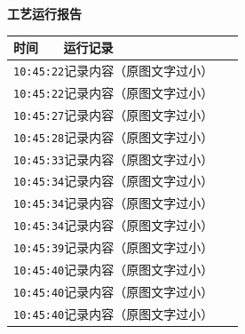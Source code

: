 \documentclass[UTF8,10pt,a4paper,fontset=fandol]{ctexart}
\newcommand{\fieldvalue}[1]{#1}
\begin{document}
\newpage

\noindent
\begin{minipage}[t]{0.48\linewidth}
\centering
\textbf{工艺运行报告}

\small
\begin{tabular}{|p{0.20\linewidth}|p{0.72\linewidth}|}
\hline
时间 & 运行记录\\ \hline
\multicolumn{2}{|l|}{
\fieldvalue{\texttt{10:45:22}\quad 记录内容（原图文字过小）}} \\ \hline
\multicolumn{2}{|l|}{
\fieldvalue{\texttt{10:45:22}\quad 记录内容（原图文字过小）}} \\ \hline
\multicolumn{2}{|l|}{
\fieldvalue{\texttt{10:45:27}\quad 记录内容（原图文字过小）}} \\ \hline
\multicolumn{2}{|l|}{
\fieldvalue{\texttt{10:45:28}\quad 记录内容（原图文字过小）}} \\ \hline
\multicolumn{2}{|l|}{
\fieldvalue{\texttt{10:45:33}\quad 记录内容（原图文字过小）}} \\ \hline
\multicolumn{2}{|l|}{
\fieldvalue{\texttt{10:45:34}\quad 记录内容（原图文字过小）}} \\ \hline
\multicolumn{2}{|l|}{
\fieldvalue{\texttt{10:45:34}\quad 记录内容（原图文字过小）}} \\ \hline
\multicolumn{2}{|l|}{
\fieldvalue{\texttt{10:45:34}\quad 记录内容（原图文字过小）}} \\ \hline
\multicolumn{2}{|l|}{
\fieldvalue{\texttt{10:45:39}\quad 记录内容（原图文字过小）}} \\ \hline
\multicolumn{2}{|l|}{
\fieldvalue{\texttt{10:45:40}\quad 记录内容（原图文字过小）}} \\ \hline
\multicolumn{2}{|l|}{
\fieldvalue{\texttt{10:45:40}\quad 记录内容（原图文字过小）}} \\ \hline
\multicolumn{2}{|l|}{
\fieldvalue{\texttt{10:45:40}\quad 记录内容（原图文字过小）}} \\ \hline

\end{tabular}
\end{minipage}
\end{document}
